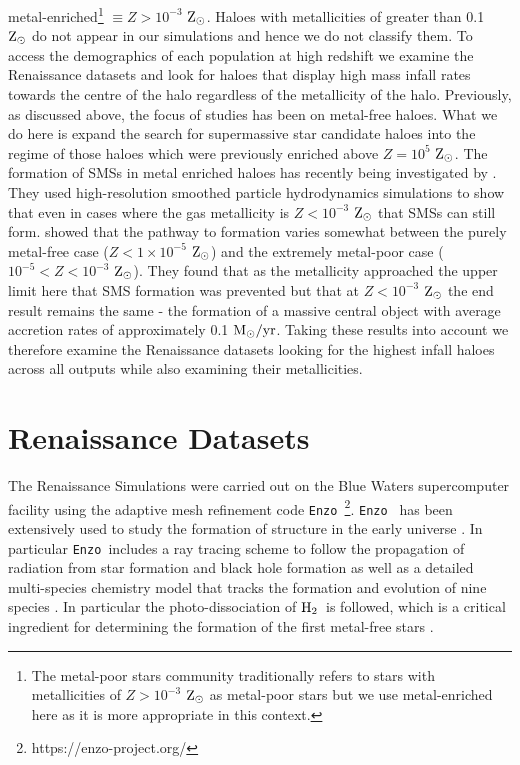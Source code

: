 \documentclass[graphics, twocolumn, usenatbib]{mn2e}
\newcommand{\enzo}{\texttt{Enzo~}}
\newcommand{\msolaryrc} {$\rm{M_{\odot}/yr}$}
\newcommand{\zsolar} {$\rm{Z_{\odot}}~$}
\newcommand{\zsolarc} {$\rm{Z_{\odot}}$}
\newcommand{\molH} {$\rm{H_2}$~}
\begin{document}
metal-enriched\footnote{The metal-poor stars community traditionally refers to stars with
  metallicities of $Z > 10^{-3}$ \zsolar as metal-poor stars but we use metal-enriched here as it
  is more appropriate in this context.} $\equiv Z > 10^{-3}$ \zsolarc. Haloes with metallicities of
greater than 0.1 \zsolar do not appear in our simulations and hence we do not classify them.
To access the demographics of each population at high redshift we examine the Renaissance datasets
and look for haloes that display high mass infall
  rates towards the centre of the halo regardless of the metallicity of the halo. Previously, as
  discussed above, the focus of studies has been on metal-free haloes. What we do here is expand
  the search for supermassive star candidate haloes into the regime of those haloes which were
  previously enriched above $Z = 10^5$ \zsolarc. The formation of SMSs in metal enriched haloes
  has recently being
  investigated by \cite{Chon_2020}. They used high-resolution smoothed particle hydrodynamics
  simulations to show that even in cases where the gas metallicity is 
    $Z < 10^{-3}$ \zsolar that SMSs can still form. \cite{Chon_2020} showed that the pathway to
    formation varies somewhat between the purely metal-free case ($Z < 1 \times 10^{-5}$ \zsolarc) and
    the extremely metal-poor case  ($10^{-5} <  Z < 10^{-3}$ \zsolarc). They found that as the 
    metallicity approached the upper limit here that SMS formation was prevented but that at
    $Z < 10^{-3}$ \zsolar the end result remains the same - the formation
  of a massive central object with average accretion rates of approximately 0.1 \msolaryrc.
  Taking these results into account we therefore examine the Renaissance datasets looking
  for the highest infall haloes across all outputs while also examining their metallicities. 

\section{Renaissance Datasets} \label{Sec:RenaissanceDatasets}
The Renaissance Simulations were carried out on the Blue Waters supercomputer facility using the
adaptive mesh refinement code \enzo\citep{Enzo_2014, Enzo_2019}\footnote{https://enzo-project.org/}. \enzo
has been extensively used to study the formation of structure in the early universe
\citep{Abel_2002, OShea_2005b, Turk_2012, Wise_2012b, Wise_2014, Regan_2015, Regan_2017}. In particular
\enzo includes a ray tracing scheme to follow the propagation of radiation from star formation and
black hole formation \citep{WiseAbel_2011} as well as a detailed multi-species chemistry model that
tracks the formation and evolution of nine species \citep{Anninos_1997, Abel_1997, Grackle}. In
particular the photo-dissociation of \molH is followed, which is a critical ingredient for
determining the formation of the first metal-free stars \citep{Abel_2000}. 
\end{document}
